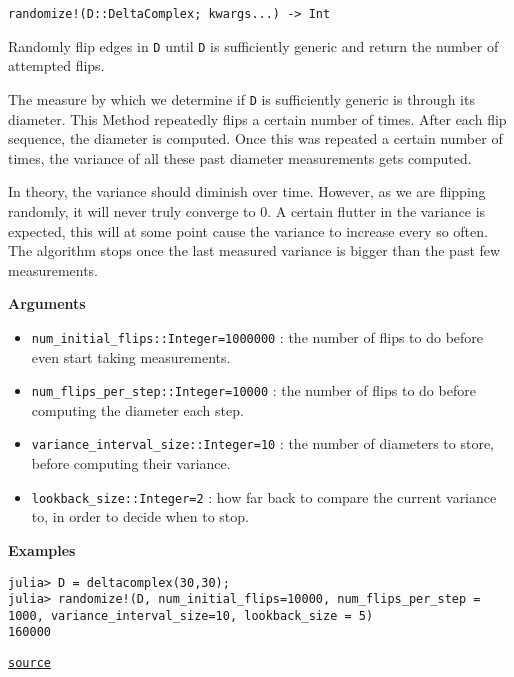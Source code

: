 \begin{adjustwidth}{2em}{0pt}


\begin{verbatim}
randomize!(D::DeltaComplex; kwargs...) -> Int
\end{verbatim}

Randomly flip edges in \texttt{D} until \texttt{D} is sufficiently generic and return the number of attempted flips.

The measure by which we determine if \texttt{D} is sufficiently generic is through its diameter. This Method repeatedly flips a certain number of times. After each flip sequence, the diameter is computed. Once this was repeated a certain number of times, the variance of all these past diameter measurements gets computed.

In theory, the variance should diminish over time. However, as we are flipping randomly, it will never truly converge to 0. A certain flutter in the variance is expected, this will at some point cause the variance to increase every so often. The algorithm stops once the last measured variance is bigger than the past few measurements.

\textbf{Arguments}

\begin{itemize}
\item \texttt{num\_initial\_flips::Integer=1000000} : the number of flips to do before even start taking measurements.


\item \texttt{num\_flips\_per\_step::Integer=10000} : the number of flips to do before computing the diameter each step.


\item \texttt{variance\_interval\_size::Integer=10} : the number of diameters to store, before computing their variance. 


\item \texttt{lookback\_size::Integer=2} : how far back to compare the current variance to, in order to decide when to stop. 

\end{itemize}
\textbf{Examples}


\begin{verbatim}
julia> D = deltacomplex(30,30);
julia> randomize!(D, num_initial_flips=10000, num_flips_per_step = 1000, variance_interval_size=10, lookback_size = 5)
160000
\end{verbatim}



\href{https://github.com/schto223/FlipGraphs.jl/blob/490c01a7adf74b42f27dda05099165c47ae8133e/src/deltaComplex.jl#L1033-L1059}{\texttt{source}}


\end{adjustwidth}

